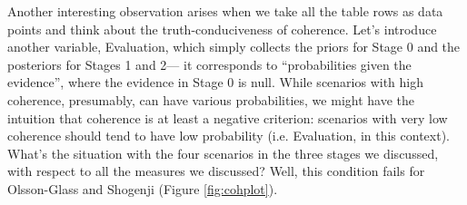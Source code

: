 \documentclass[10pt,]{scrartcl}
\begin{document}
\begin{table}[H]
\centering
{}
\caption{Satisfaction of intuitions about the Sally Clark problem.}
\label{tab:scDesiderata}
\end{table}









    
    

Another interesting observation arises when we take all the table rows as data points and think about the truth-conduciveness of coherence.  Let's introduce another variable, \textsf{Evaluation}, which simply collects the priors for Stage 0 and the posteriors for Stages 1 and 2--- it corresponds to ``probabilities given the evidence'', where the evidence in Stage 0 is null. While scenarios with high coherence, presumably, can have various probabilities, we might have the intuition that coherence is at least a negative criterion: scenarios with very low coherence should tend to have low probability (i.e. \textsf{Evaluation}, in this context). What's the situation with the four scenarios in the three stages we discussed, with respect to all the measures we discussed? Well, this condition  fails for Olsson-Glass and Shogenji   (Figure \ref{fig:cohplot}).
\end{document}
